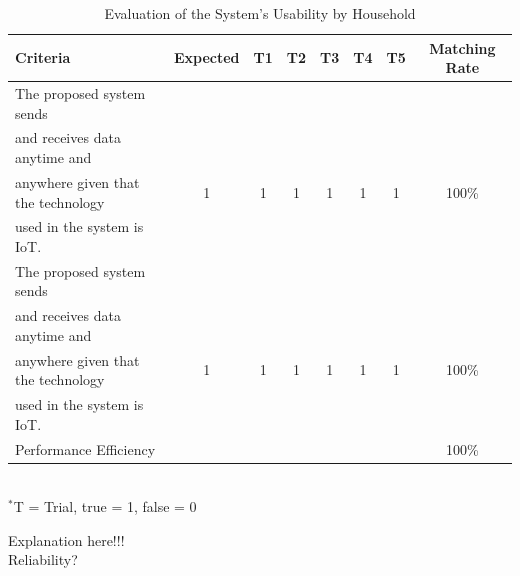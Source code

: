 \begin{table}[h!]
\caption{Evaluation of the System’s Usability by Household}
\vspace{-1em}
\begin{center}
\fontsize{10}{12}\selectfont
\begin{tabular}{|| l c c c c c c c ||} 
 \hline
 Criteria & Expected & T1 & T2 & T3 & T4 & T5 & Matching Rate \\ [0.5ex] 
 \hline\hline
The proposed system sends &  &  &  &  &  &  &  \\
and receives data anytime and &  &  &  &  &  &  &  \\
anywhere given that the technology & 1 & 1 & 1 & 1 & 1 & 1 & 100\% \\
used in the system is IoT. &  &  &  &  &  &  &  \\ 
\hline
The proposed system sends &  &  &  &  &  &  &  \\
and receives data anytime and &  &  &  &  &  &  &  \\
anywhere given that the technology & 1 & 1 & 1 & 1 & 1 & 1 & 100\% \\
used in the system is IoT. &  &  &  &  &  &  &  \\ 
\hline
Performance Efficiency &  &  &  &  &  &  & 100\% \\ 
\hline
\end{tabular} \\
\footnotesize{\hspace{-10cm}$^*$T = Trial, true = 1, false = 0}
\end{center}
\end{table} 

Explanation here!!! \lipsum[1] \\

\indent\indent Reliability? \\

